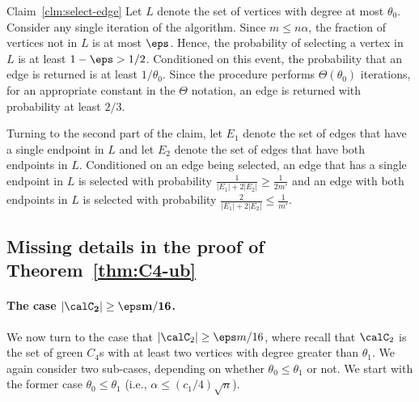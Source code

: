\documentclass{article}
\begin{document}
\begin{proofof}{Claim~\ref{clm:select-edge}}
Let $L$ denote the set of vertices with degree at most $\theta_0$.
Consider any single iteration of the algorithm.
Since $m\leq n\alpha$, the fraction of vertices not in $L$
is at most $\eps$.  Hence, the probability of selecting a vertex in $L$ is at least $1-\eps > 1/2$.
Conditioned on this event, the probability that an edge is returned is at least $1/\theta_0$.
Since the procedure performs $\Theta(\theta_0)$ iterations, for an appropriate constant in the $\Theta$ notation, an edge is returned with probability at least $2/3$.

Turning to the second part of the claim,
let $E_1$ denote the set of edges that have a single endpoint in $L$ and let $E_2$ denote the set of edges that have both endpoints in $L$.
Conditioned on an edge being selected, an edge that has a single endpoint in $L$ is selected with probability 
$\frac{1}{|E_1| + 2|E_2|} \geq \frac{1}{2m'}$ and an edge with both endpoints in $L$ is selected with probability
$\frac{2}{|E_1| + 2|E_2|} \leq \frac{1}{m'}$.
\end{proofof}

\subsection{Missing details in the proof of Theorem~\ref{thm:C4-ub}}\label{append:case-C2}
\paragraph{The case $\mathbf{|\calC_2| \geq \eps m/16}$.}
We now turn to the case that $|\calC_2| \geq \eps m/16$, 
where recall that $\calC_2$ is the set of green $C_4$s with at least two vertices with degree greater than $\theta_1$. 
We again consider two sub-cases, depending on whether $\theta_0\leq \theta_1$ or not. 
We start with the former case $\theta_0\leq \theta_1$ (i.e., $\alpha \leq (c_1/4)\sqrt n$). 
\end{document}
